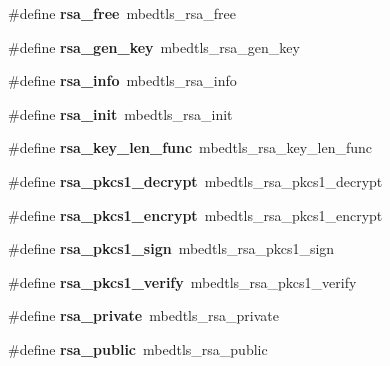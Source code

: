 \begin{DoxyCompactItemize}
\#define {\bfseries rsa\+\_\+free}~mbedtls\+\_\+rsa\+\_\+free
\item 
\mbox{\label{compat-1_83_8h_aaacc997d1aa607cde19de05f971c074d}} 
\#define {\bfseries rsa\+\_\+gen\+\_\+key}~mbedtls\+\_\+rsa\+\_\+gen\+\_\+key
\item 
\mbox{\label{compat-1_83_8h_a8c7d425ac833776f873077cbf9234248}} 
\#define {\bfseries rsa\+\_\+info}~mbedtls\+\_\+rsa\+\_\+info
\item 
\mbox{\label{compat-1_83_8h_abde4a4fa8aab7486e5628ccefeea553e}} 
\#define {\bfseries rsa\+\_\+init}~mbedtls\+\_\+rsa\+\_\+init
\item 
\mbox{\label{compat-1_83_8h_a78398579d386528d9bfe9c4664c8d8ac}} 
\#define {\bfseries rsa\+\_\+key\+\_\+len\+\_\+func}~mbedtls\+\_\+rsa\+\_\+key\+\_\+len\+\_\+func
\item 
\mbox{\label{compat-1_83_8h_a415394cd965d350fd07aa3d2b824bc44}} 
\#define {\bfseries rsa\+\_\+pkcs1\+\_\+decrypt}~mbedtls\+\_\+rsa\+\_\+pkcs1\+\_\+decrypt
\item 
\mbox{\label{compat-1_83_8h_aa1299854fee131031b0889a2c31a248a}} 
\#define {\bfseries rsa\+\_\+pkcs1\+\_\+encrypt}~mbedtls\+\_\+rsa\+\_\+pkcs1\+\_\+encrypt
\item 
\mbox{\label{compat-1_83_8h_a022e23386b166e93b9fc322ba4a5b934}} 
\#define {\bfseries rsa\+\_\+pkcs1\+\_\+sign}~mbedtls\+\_\+rsa\+\_\+pkcs1\+\_\+sign
\item 
\mbox{\label{compat-1_83_8h_a4f75a6a504cc188e1b116e41bddd3639}} 
\#define {\bfseries rsa\+\_\+pkcs1\+\_\+verify}~mbedtls\+\_\+rsa\+\_\+pkcs1\+\_\+verify
\item 
\mbox{\label{compat-1_83_8h_aacebb82dfd25a8ca81bbf6dcac264ce3}} 
\#define {\bfseries rsa\+\_\+private}~mbedtls\+\_\+rsa\+\_\+private
\item 
\mbox{\label{compat-1_83_8h_afd078f76c12b53940e6cd94a897dbeeb}} 
\#define {\bfseries rsa\+\_\+public}~mbedtls\+\_\+rsa\+\_\+public
\item 

\end{DoxyCompactItemize}
